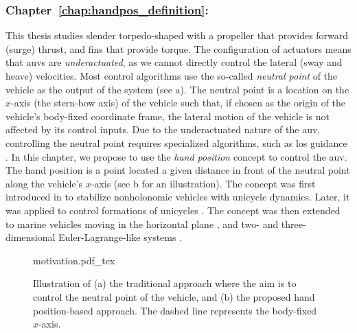

\subsubsection{Chapter~\ref{chap:handpos_definition}: }

This thesis studies slender torpedo-shaped  with a propeller that provides forward (surge) thrust, and fins that provide torque.
The configuration of actuators means that \glspl{auv} are \emph{underactuated}, as we cannot directly control the lateral (sway and heave) velocities.
Most control algorithms use the so-called \emph{neutral point} of the vehicle as the output of the system (see a).
The neutral point is a location on the $x$-axis (the stern-bow axis) of the vehicle such that, if chosen as the origin of the vehicle's body-fixed coordinate frame, the lateral motion of the vehicle is not affected by its control inputs.
Due to the underactuated nature of the \gls{auv}, controlling the neutral point requires specialized algorithms, such as \acrlong{los} guidance \cite{caharija_path-following-ILOS_2016,xiang_path-following-robust_2017,miao_path-following-curvilinear_2017,borhaug_straight_2007}.
In this chapter, we propose to use the \emph{hand position} concept to control the \gls{auv}.
The hand position is a point located a given distance in front of the neutral point along the vehicle's $x$-axis (see b for an illustration).
The concept was first introduced in \cite{pomet_hand-position_1992} to stabilize nonholonomic vehicles with unicycle dynamics.
Later, it was applied to control formations of unicycles \cite{lawton_hand-position-formation_2003}.
The concept was then extended to marine vehicles moving in the horizontal plane \cite{paliotta_trajectory_2019}, and two- and three-dimensional Euler-Lagrange-like systems \cite{cai_hand-position-rigidity-planar_2015,li_hand-position-rigidity-3d_2021}.

\begin{figure}[b]
    \centering
    \def\svgwidth{0.65\textwidth}
    {motivation.pdf_tex}
    \caption{Illustration of (a) the traditional approach where the aim is to control the neutral point of the vehicle, and (b) the proposed hand position-based approach. The dashed line represents the body-fixed $x$-axis.}
    \label{fig:handpos_def_motivation}
\end{figure}

